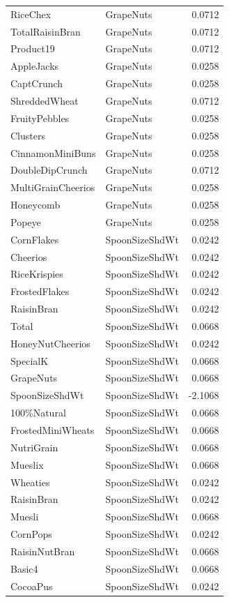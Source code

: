 \begin{longtable}{llr}
RiceChex & GrapeNuts & 0.0712 \\
TotalRaisinBran & GrapeNuts & 0.0712 \\
Product19 & GrapeNuts & 0.0712 \\
AppleJacks & GrapeNuts & 0.0258 \\
CaptCrunch & GrapeNuts & 0.0258 \\
ShreddedWheat & GrapeNuts & 0.0712 \\
FruityPebbles & GrapeNuts & 0.0258 \\
Clusters & GrapeNuts & 0.0258 \\
CinnamonMiniBuns & GrapeNuts & 0.0258 \\
DoubleDipCrunch & GrapeNuts & 0.0712 \\
MultiGrainCheerios & GrapeNuts & 0.0258 \\
Honeycomb & GrapeNuts & 0.0258 \\
Popeye & GrapeNuts & 0.0258 \\
CornFlakes & SpoonSizeShdWt & 0.0242 \\
Cheerios & SpoonSizeShdWt & 0.0242 \\
RiceKrispies & SpoonSizeShdWt & 0.0242 \\
FrostedFlakes & SpoonSizeShdWt & 0.0242 \\
RaisinBran & SpoonSizeShdWt & 0.0242 \\
Total & SpoonSizeShdWt & 0.0668 \\
HoneyNutCheerios & SpoonSizeShdWt & 0.0242 \\
SpecialK & SpoonSizeShdWt & 0.0668 \\
GrapeNuts & SpoonSizeShdWt & 0.0668 \\
SpoonSizeShdWt & SpoonSizeShdWt & -2.1068 \\
100\%Natural & SpoonSizeShdWt & 0.0668 \\
FrostedMiniWheats & SpoonSizeShdWt & 0.0668 \\
NutriGrain & SpoonSizeShdWt & 0.0668 \\
Mueslix & SpoonSizeShdWt & 0.0668 \\
Wheaties & SpoonSizeShdWt & 0.0242 \\
RaisinBran & SpoonSizeShdWt & 0.0242 \\
Muesli & SpoonSizeShdWt & 0.0668 \\
CornPops & SpoonSizeShdWt & 0.0242 \\
RaisinNutBran & SpoonSizeShdWt & 0.0668 \\
Basic4 & SpoonSizeShdWt & 0.0668 \\
CocoaPus & SpoonSizeShdWt & 0.0242 \\

\end{longtable}

